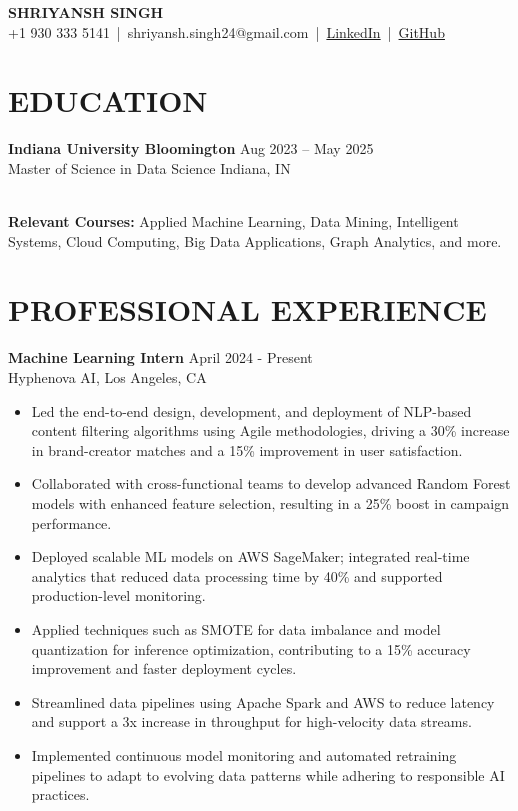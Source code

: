 \documentclass[12pt,a4paper]{article}
\newcommand{\cvitem}[4]{
  \textbf{#1} \hfill #2\\
  #3 \hfill #4 \par\vspace{-0.5em}
}
\newcommand{\workexp}[4]{
  \textbf{#1} \hfill #2\\
  #3 \hfill #4\\
  \vspace{-1em}
}
\begin{document}
\begin{center}
\textbf{\LARGE SHRIYANSH SINGH}\\
\normalsize
+1 930 333 5141 \,|\, shriyansh.singh24@gmail.com \,|\, \href{https://www.linkedin.com/in/shriyansh-bir-singh}{LinkedIn} \,|\, \href{https://github.com/shriyansh24}{GitHub}
\end{center}

\section*{EDUCATION}
\cvitem{Indiana University Bloomington}{Aug 2023 – May 2025}{Master of Science in Data Science}{Indiana, IN}\\[0.5em]
\textnormal{\textbf{Relevant Courses:} Applied Machine Learning, Data Mining, Intelligent Systems, Cloud Computing, Big Data Applications, Graph Analytics, and more.}

\section*{PROFESSIONAL EXPERIENCE}
\workexp{Machine Learning Intern}{April 2024 - Present}{Hyphenova AI, Los Angeles, CA}{
  \begin{itemize}[leftmargin=*,noitemsep,topsep=0pt]
    \item Led the end-to-end design, development, and deployment of NLP-based content filtering algorithms using Agile methodologies, driving a 30\% increase in brand-creator matches and a 15\% improvement in user satisfaction.
    \item Collaborated with cross-functional teams to develop advanced Random Forest models with enhanced feature selection, resulting in a 25\% boost in campaign performance.
    \item Deployed scalable ML models on AWS SageMaker; integrated real-time analytics that reduced data processing time by 40\% and supported production-level monitoring.
    \item Applied techniques such as SMOTE for data imbalance and model quantization for inference optimization, contributing to a 15\% accuracy improvement and faster deployment cycles.
    \item Streamlined data pipelines using Apache Spark and AWS to reduce latency and support a 3x increase in throughput for high-velocity data streams.
    \item Implemented continuous model monitoring and automated retraining pipelines to adapt to evolving data patterns while adhering to responsible AI practices.
  \end{itemize}
}
\end{document}
